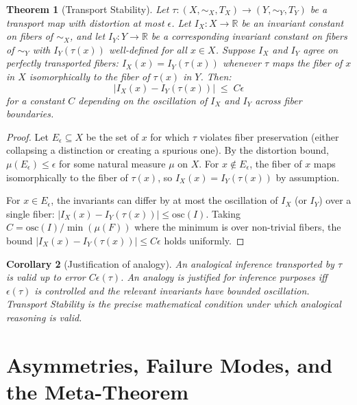 \documentclass[12pt, a4paper]{article}
\theoremstyle{plain}
\newtheorem{theorem}{Theorem}[section]
\newtheorem{corollary}[theorem]{Corollary}
\theoremstyle{definition}
\theoremstyle{remark}
\newcommand{\eps}{\epsilon}
\begin{document}
\begin{theorem}[Transport Stability]
\label{thm:transport-stability}
Let $\tau:(X,\sim_X,T_X)\to(Y,\sim_Y,T_Y)$ be a transport map with
distortion at most $\eps$. Let $I_X:X\to\mathbb{R}$ be an invariant constant
on fibers of $\sim_X$, and let $I_Y:Y\to\mathbb{R}$ be a corresponding
invariant constant on fibers of $\sim_Y$ with $I_Y(\tau(x))$ well-defined
for all $x\in X$. Suppose $I_X$ and $I_Y$ agree on perfectly transported
fibers: $I_X(x)=I_Y(\tau(x))$ whenever $\tau$ maps the fiber of $x$ in $X$
isomorphically to the fiber of $\tau(x)$ in $Y$. Then:
\[
  |I_X(x) - I_Y(\tau(x))| \;\le\; C\eps
\]
for a constant $C$ depending on the oscillation of $I_X$ and $I_Y$ across
fiber boundaries.
\end{theorem}

\begin{proof}
Let $E_\eps\subseteq X$ be the set of $x$ for which $\tau$ violates
fiber preservation (either collapsing a distinction or creating a spurious
one). By the distortion bound, $\mu(E_\eps)\le\eps$ for some natural
measure $\mu$ on $X$. For $x\notin E_\eps$, the fiber of $x$ maps
isomorphically to the fiber of $\tau(x)$, so $I_X(x)=I_Y(\tau(x))$ by
assumption.

For $x\in E_\eps$, the invariants can differ by at most the oscillation of
$I_X$ (or $I_Y$) over a single fiber: $|I_X(x)-I_Y(\tau(x))|\le\mathrm{osc}(I)$.
Taking $C=\mathrm{osc}(I)/\min(\mu(F))$ where the minimum is over non-trivial
fibers, the bound $|I_X(x)-I_Y(\tau(x))|\le C\eps$ holds uniformly.
\end{proof}

\begin{corollary}[Justification of analogy]
An analogical inference transported by $\tau$ is valid up to error $C\eps(\tau)$.
An analogy is \emph{justified} for inference purposes iff $\eps(\tau)$ is
controlled and the relevant invariants have bounded oscillation. Transport
Stability is the precise mathematical condition under which analogical reasoning
is valid.
\end{corollary}

\section{Asymmetries, Failure Modes, and the Meta-Theorem}
\label{sec:asymmetry}
\end{document}

